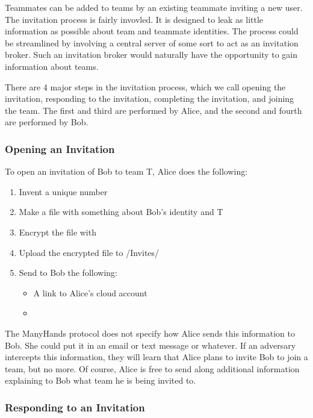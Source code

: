 \documentclass[pldi,10pt,preprint]{sigplanconf-pldi16}
\begin{document}
Teammates can be added to teams by an existing teammate inviting a new user.
The invitation process is fairly invovled.
It is designed to leak as little information as possible about team and teammate identities.
The process could be streamlined by involving a central server of some sort to act as an invitation broker.
Such an invitation broker would naturally have the opportunity to gain information about teams.

There are 4 major steps in the invitation process, which we call opening the invitation, responding to the invitation, completing the invitation, and joining the team.
The first and third are performed by Alice, and the second and fourth are performed by Bob.

\subsubsection{Opening an Invitation}

To open an invitation of Bob to team T, Alice does the following:

\begin{enumerate}
\item Invent a unique number 
\item Make a file with something about Bob's identity and T
\item Encrypt the file with 
\item Upload the encrypted file to /Invites/
\item Send to Bob the following:
  \begin{itemize}
  \item A link to Alice's cloud account
  \item {}
  \end{itemize}
\end{enumerate}

The ManyHands protocol does not specify how Alice sends this information to Bob.
She could put it in an email or text message or whatever.
If an adversary intercepts this information, they will learn that Alice plans to invite Bob to join a team, but no more.
Of course, Alice is free to send along additional information explaining to Bob what team he is being invited to.

\subsubsection{Responding to an Invitation}
\end{document}
